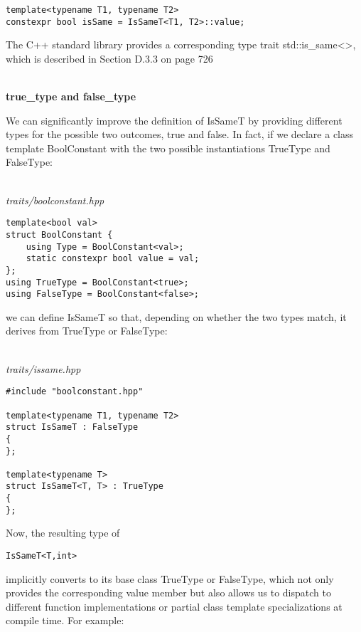 \begin{lstlisting}[style=styleCXX]
template<typename T1, typename T2>
constexpr bool isSame = IsSameT<T1, T2>::value;
\end{lstlisting}

The C++ standard library provides a corresponding type trait std::is\_same<>, which is described in Section D.3.3 on page 726

\hspace*{\fill} \\ %
\noindent
\textbf{true\_type and false\_type}

We can significantly improve the definition of IsSameT by providing different types for the possible two outcomes, true and false. In fact, if we declare a class template BoolConstant with the two possible instantiations TrueType and FalseType:

\hspace*{\fill} \\ %
\noindent
\textit{traits/boolconstant.hpp}
\begin{lstlisting}[style=styleCXX]
template<bool val>
struct BoolConstant {
	using Type = BoolConstant<val>;
	static constexpr bool value = val;
};
using TrueType = BoolConstant<true>;
using FalseType = BoolConstant<false>;
\end{lstlisting}

we can define IsSameT so that, depending on whether the two types match, it derives from TrueType or FalseType:

\hspace*{\fill} \\ %
\noindent
\textit{traits/issame.hpp}
\begin{lstlisting}[style=styleCXX]
#include "boolconstant.hpp"

template<typename T1, typename T2>
struct IsSameT : FalseType
{
};

template<typename T>
struct IsSameT<T, T> : TrueType
{
};
\end{lstlisting}

Now, the resulting type of

\begin{lstlisting}[style=styleCXX]
IsSameT<T,int>
\end{lstlisting}

implicitly converts to its base class TrueType or FalseType, which not only provides the corresponding value member but also allows us to dispatch to different function implementations or partial class template specializations at compile time. For example:

